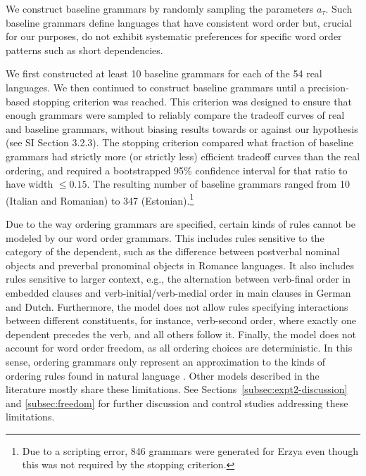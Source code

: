 We construct baseline grammars by randomly sampling the parameters $a_\tau$.
Such baseline grammars define languages that have consistent word order but, crucial for our purposes, do not exhibit systematic preferences for specific word order patterns such as short dependencies. %


We first constructed at least 10 baseline grammars for each of the 54 real languages.
We then continued to construct baseline grammars until a precision-based stopping criterion was reached. This criterion was designed to ensure that enough grammars were sampled to reliably compare the tradeoff curves of real and baseline grammars, without biasing results towards or against our hypothesis (see SI Section 3.2.3).
The stopping criterion compared what fraction of baseline grammars had strictly more (or strictly less) efficient tradeoff curves than the real ordering, and required a bootstrapped 95\% confidence interval for that ratio to have width $\leq 0.15$.
The resulting number of baseline grammars ranged from 10 (Italian and Romanian) to 347 (Estonian).\footnote{Due to a scripting error, 846 grammars were generated for Erzya even though this was not required by the stopping criterion.}

Due to the way ordering grammars are specified, certain kinds of rules cannot be modeled by our word order grammars.
This includes rules sensitive to the category of the dependent, such as the difference between postverbal nominal objects and preverbal pronominal objects in Romance languages.
It also includes rules sensitive to larger context, e.g., the alternation between verb-final order in embedded clauses and verb-initial/verb-medial order in main clauses in German and Dutch.
Furthermore, the model does not allow rules specifying interactions between different constituents, for instance, verb-second order, where exactly one dependent precedes the verb, and all others follow it.
Finally, the model does not account for word order freedom, as all ordering choices are deterministic.
In this sense, ordering grammars only represent an approximation to the kinds of ordering rules found in natural language \citep{gildea-optimizing-2007, gildea-grammars-2010, gildea-human-2015}.
Other models described in the literature \citep{futrell2015experiments, wang2016galactic} mostly share these limitations.
See Sections~\ref{subsec:expt2-discussion} and \ref{subsec:freedom} for further discussion and control studies addressing these limitations.



